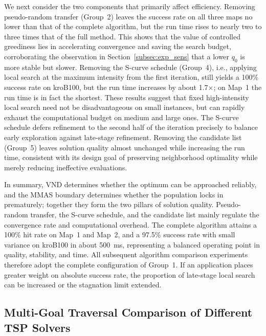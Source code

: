 \documentclass[lettersize,journal]{IEEEtran}
\begin{document}
We next consider the two components that primarily affect efficiency. Removing pseudo-random transfer (Group~2) leaves the success rate on all three maps no lower than that of the complete algorithm, but the run time rises to nearly two to three times that of the full method. This shows that the value of controlled greediness lies in accelerating convergence and saving the search budget, corroborating the observation in Section~\textcolor{blue}{\ref{subsec:exp_sens}} that a lower $q_0$ is more stable but slower. Removing the S-curve schedule (Group~4), i.e., applying local search at the maximum intensity from the first iteration, still yields a 100\% success rate on kroB100, but the run time increases by about 1.7$\times$; on Map~1 the run time is in fact the shortest. These results suggest that fixed high-intensity local search need not be disadvantageous on small instances, but can rapidly exhaust the computational budget on medium and large ones. The S-curve schedule defers refinement to the second half of the iteration precisely to balance early exploration against late-stage refinement. Removing the candidate list (Group~5) leaves solution quality almost unchanged while increasing the run time, consistent with its design goal of preserving neighborhood optimality while merely reducing ineffective evaluations.

In summary, VND determines whether the optimum can be approached reliably, and the MMAS boundary determines whether the population locks in prematurely; together they form the two pillars of solution quality. Pseudo-random transfer, the S-curve schedule, and the candidate list mainly regulate the convergence rate and computational overhead. The complete algorithm attains a 100\% hit rate on Map~1 and Map~2, and a 97.5\% success rate with small variance on kroB100 in about 500~ms, representing a balanced operating point in quality, stability, and time. All subsequent algorithm comparison experiments therefore adopt the complete configuration of Group~1. If an application places greater weight on absolute success rate, the proportion of late-stage local search can be increased or the stagnation limit extended.

\subsection{Multi-Goal Traversal Comparison of Different TSP Solvers}
\label{subsec:exp_cmp}
\end{document}
